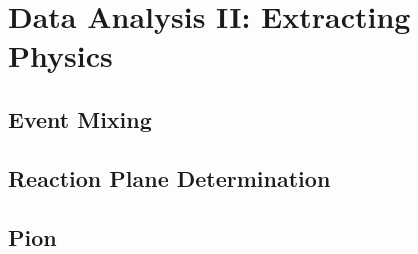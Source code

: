 \chapter{Data Analysis II: Extracting Physics}
\section{Event Mixing}
\section{Reaction Plane Determination}
\section{Pion }

